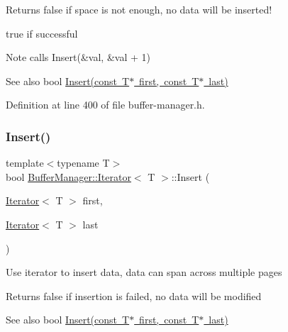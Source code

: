 \begin{DoxyReturn}{Returns}
false if space is not enough, no data will be inserted! 

true if successful 
\end{DoxyReturn}
\begin{DoxyNote}{Note}
calls {\ttfamily Insert(\&val, \&val + 1)} 
\end{DoxyNote}
\begin{DoxySeeAlso}{See also}
{\ttfamily bool \mbox{\hyperlink{class_buffer_manager_1_1_iterator_a7a42be8229dace561a4e71f80ab406f2}{Insert(const T$\ast$ first, const T$\ast$ last)}}} 
\end{DoxySeeAlso}


Definition at line 400 of file buffer-\/manager.\+h.

\mbox{\label{class_buffer_manager_1_1_iterator_ad977beaab2295e8d8e3cedd7ff555a4d}} 
\subsubsection{\texorpdfstring{Insert()}{Insert()}\hspace{0.1cm}{\footnotesize\ttfamily [3/3]}}
{\footnotesize\ttfamily template$<$typename T$>$ \\
bool \mbox{\hyperlink{class_buffer_manager_1_1_iterator}{Buffer\+Manager\+::\+Iterator}}$<$ T $>$\+::Insert (\begin{DoxyParamCaption}\item[{\mbox{\hyperlink{class_buffer_manager_1_1_iterator}{Iterator}}$<$ T $>$}]{first,  }\item[{\mbox{\hyperlink{class_buffer_manager_1_1_iterator}{Iterator}}$<$ T $>$}]{last }\end{DoxyParamCaption})\hspace{0.3cm}{\ttfamily [inline]}}

Use iterator to insert data, data can span across multiple pages \begin{DoxyReturn}{Returns}
false if insertion is failed, no data will be modified 
\end{DoxyReturn}
\begin{DoxySeeAlso}{See also}
{\ttfamily bool \mbox{\hyperlink{class_buffer_manager_1_1_iterator_a7a42be8229dace561a4e71f80ab406f2}{Insert(const T$\ast$ first, const T$\ast$ last)}}} 
\end{DoxySeeAlso}



